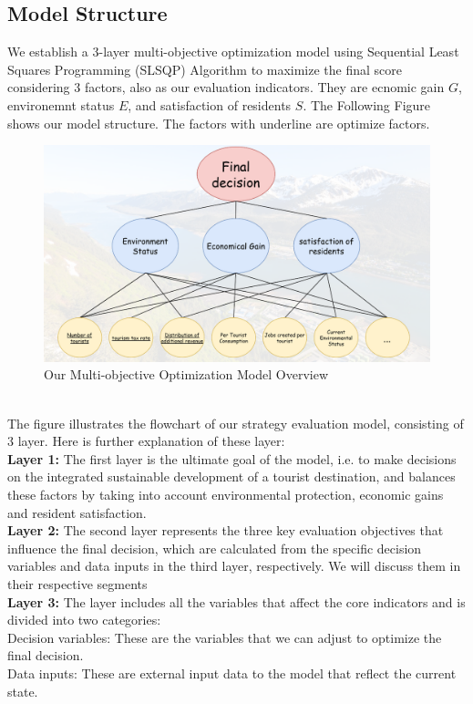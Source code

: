 \documentclass[UTF8]{mcmthesis}
\begin{document}
    \subsection{Model Structure}
    \hspace*{2em} We establish a 3-layer multi-objective optimization model using Sequential Least Squares Programming (SLSQP) Algorithm to maximize the final score considering 3 factors, also as our  evaluation indicators. They are ecnomic gain {$G$}, environemnt status {$E$}, and satisfaction of residents {$S$}. The Following Figure shows our model structure. The factors with underline are optimize factors.
    \begin{figure}[htbp]
        \centering
        \includegraphics[width=16cm]{multiobjective.png}
        \caption{Our Multi-objective Optimization Model Overview}
    \end{figure}\\
    \hspace*{2em} The figure illustrates the flowchart of our strategy evaluation model, consisting of 3 layer. Here is further explanation of these layer:
    \\ \hspace*{2em} \textbf{Layer 1:} The first layer is the ultimate goal of the model, i.e. to make decisions on the integrated sustainable development of a tourist destination, and balances these factors by taking into account environmental protection, economic gains and resident satisfaction.
    \\ \hspace*{2em} \textbf{Layer 2:} The second layer represents the three key evaluation objectives that influence the final decision, which are calculated from the specific decision variables and data inputs in the third layer, respectively. We will discuss them in their respective segments
    \\ \hspace*{2em} \textbf{Layer 3:} The layer includes all the variables that affect the core indicators and is divided into two categories:
    \\\hspace*{2em}Decision variables:
    These are the variables that we can adjust to optimize the final decision.
    \\\hspace*{2em}Data inputs:
    These are external input data to the model that reflect the current state.
    
\end{document}

